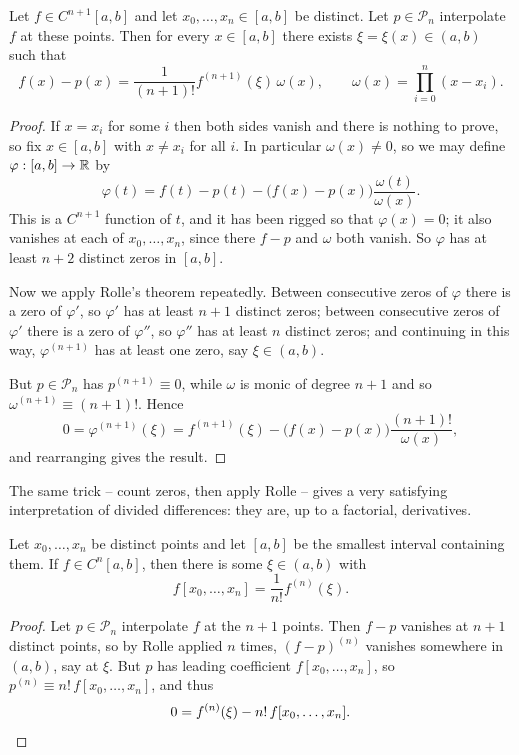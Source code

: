 \documentclass[a4paper]{scrartcl}
\newcommand{\Pn}[1]{\mathcal{P}_{#1}}
\begin{document}
\begin{theorem}\label{thm:interperror}
  Let $f \in C^{n+1}[a, b]$ and let $x_0, \dots, x_n \in [a, b]$ be distinct. Let $p \in \Pn{n}$ interpolate $f$ at these points. Then for every $x \in [a,b]$ there exists $\xi = \xi(x) \in (a,b)$ such that
  $$
  f(x) - p(x) = \frac{1}{(n+1)!}f^{(n+1)}(\xi) \, \omega(x), \qquad \omega(x) = \prod_{i=0}^{n}(x - x_i).
  $$
\end{theorem}
\begin{proof}
  If $x = x_i$ for some $i$ then both sides vanish and there is nothing to prove, so fix $x \in [a,b]$ with $x \neq x_i$ for all $i$. In particular $\omega(x) \neq 0$, so we may define $\varphi : [a,b] \to \mathbb{R}$ by
  $$
  \varphi(t) = f(t) - p(t) - \big(f(x) - p(x)\big)\frac{\omega(t)}{\omega(x)}.
  $$
  This is a $C^{n+1}$ function of $t$, and it has been rigged so that $\varphi(x) = 0$; it also vanishes at each of $x_0, \dots, x_n$, since there $f - p$ and $\omega$ both vanish. So $\varphi$ has at least $n+2$ distinct zeros in $[a,b]$.

  Now we apply Rolle's theorem repeatedly. Between consecutive zeros of $\varphi$ there is a zero of $\varphi'$, so $\varphi'$ has at least $n+1$ distinct zeros; between consecutive zeros of $\varphi'$ there is a zero of $\varphi''$, so $\varphi''$ has at least $n$ distinct zeros; and continuing in this way, $\varphi^{(n+1)}$ has at least one zero, say $\xi \in (a,b)$.

  But $p \in \Pn{n}$ has $p^{(n+1)} \equiv 0$, while $\omega$ is monic of degree $n+1$ and so $\omega^{(n+1)} \equiv (n+1)!$. Hence
  $$
  0 = \varphi^{(n+1)}(\xi) = f^{(n+1)}(\xi) - \big(f(x) - p(x)\big)\frac{(n+1)!}{\omega(x)},
  $$
  and rearranging gives the result.
\end{proof}

The same trick -- count zeros, then apply Rolle -- gives a very satisfying interpretation of divided differences: they are, up to a factorial, derivatives.

\begin{theorem}\label{thm:ddderiv}
  Let $x_0, \dots, x_n$ be distinct points and let $[a,b]$ be the smallest interval containing them. If $f \in C^n[a,b]$, then there is some $\xi \in (a, b)$ with
  $$
  f[x_0, \dots, x_n] = \frac{1}{n!}f^{(n)}(\xi).
  $$
\end{theorem}
\begin{proof}
  Let $p \in \Pn{n}$ interpolate $f$ at the $n+1$ points. Then $f - p$ vanishes at $n+1$ distinct points, so by Rolle applied $n$ times, $(f - p)^{(n)}$ vanishes somewhere in $(a,b)$, say at $\xi$. But $p$ has leading coefficient $f[x_0, \dots, x_n]$, so $p^{(n)} \equiv n!\, f[x_0, \dots, x_n]$, and thus
  $$
  0 = f^{(n)}(\xi) - n!\, f[x_0, \dots, x_n]. \qedhere
  $$
\end{proof}
\end{document}
